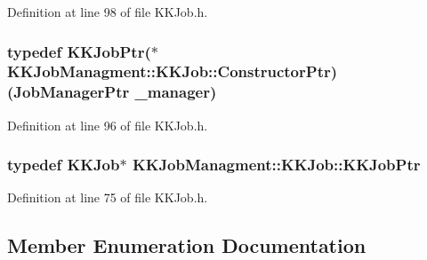 Definition at line 98 of file K\+K\+Job.\+h.

\subsubsection[{\texorpdfstring{Constructor\+Ptr}{ConstructorPtr}}]{\setlength{\rightskip}{0pt plus 5cm}typedef {\bf K\+K\+Job\+Ptr}($\ast$ K\+K\+Job\+Managment\+::\+K\+K\+Job\+::\+Constructor\+Ptr) ({\bf Job\+Manager\+Ptr} \+\_\+manager)}\hypertarget{class_k_k_job_managment_1_1_k_k_job_aaa663a535573601302dd8bc1ead56485}{}\label{class_k_k_job_managment_1_1_k_k_job_aaa663a535573601302dd8bc1ead56485}


Definition at line 96 of file K\+K\+Job.\+h.

\subsubsection[{\texorpdfstring{K\+K\+Job\+Ptr}{KKJobPtr}}]{\setlength{\rightskip}{0pt plus 5cm}typedef {\bf K\+K\+Job}$\ast$ {\bf K\+K\+Job\+Managment\+::\+K\+K\+Job\+::\+K\+K\+Job\+Ptr}}\hypertarget{class_k_k_job_managment_1_1_k_k_job_a53526e4ffe4ab2b7858f79ab0ed65a1d}{}\label{class_k_k_job_managment_1_1_k_k_job_a53526e4ffe4ab2b7858f79ab0ed65a1d}


Definition at line 75 of file K\+K\+Job.\+h.



\subsection{Member Enumeration Documentation}
